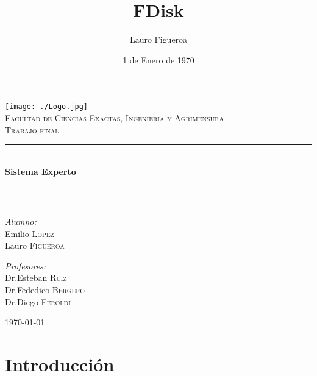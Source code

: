 \documentclass[11pt,oneside,a4paper]{article}
\title{FDisk}
\author{Lauro Figueroa}
\date{1 de Enero de 1970}
\newcommand{\HRule}{\rule{\linewidth}{0.5mm}}
\begin{document}
 
\begin{titlepage}
\begin{center}

\texttt{[image: ./Logo.jpg]}~\\[1cm]

\textsc{\LARGE Facultad de Ciencias Exactas, Ingeniería y Agrimensura}\\[1.5cm]

\textsc{\Large Trabajo final}\\[0.5cm]

\HRule \\[0.4cm]
{ \huge \bfseries Sistema Experto \\[0.4cm] }

\HRule \\[1.5cm]

\noindent
\begin{minipage}{0.4\textwidth}
\begin{flushleft} \large
\emph{Alumno:}\\
Emilio \textsc{Lopez}\\
Lauro \textsc{Figueroa}
\end{flushleft}
\end{minipage}%
\begin{minipage}{0.4\textwidth}
\begin{flushright} \large
\emph{Profesores:} \\
Dr.Esteban \textsc{Ruiz}\\
Dr.Fededico \textsc{Bergero}\\
Dr.Diego \textsc{Feroldi}
\end{flushright}
\end{minipage}

\vfill

{\large \today}

\end{center}
\end{titlepage}

\newpage 

\section*{Introducción}
\end{document}
